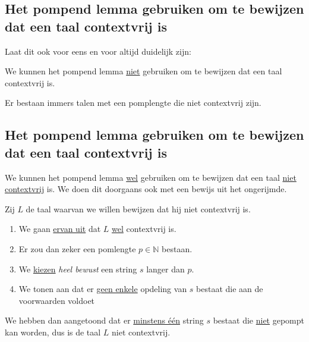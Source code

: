\documentclass[main.tex]{subfiles}
\begin{document}
\subsection{Het pompend lemma gebruiken om te bewijzen dat een taal contextvrij is}
Laat dit ook voor eens en voor altijd duidelijk zijn:
\begin{center}
  We kunnen het pompend lemma \underline{niet} gebruiken om te bewijzen dat een taal contextvrij is.
\end{center}
Er bestaan immers talen met een pomplengte die niet contextvrij zijn.

\subsection{Het pompend lemma gebruiken om te bewijzen dat een taal contextvrij is}
We kunnen het pompend lemma \underline{wel} gebruiken om te bewijzen dat een taal \underline{niet contextvrij} is.
We doen dit doorgaans ook met een bewijs uit het ongerijmde.

Zij $L$ de taal waarvan we willen bewijzen dat hij niet contextvrij is.
\begin{enumerate}
\item We gaan \underline{ervan uit} dat $L$ \underline{wel} contextvrij is.
\item Er zou dan zeker een pomlengte $p\in \mathbb{N}$ bestaan.
\item We \underline{kiezen} \emph{heel bewust} een string $s$ langer dan $p$.
\item We tonen aan dat er \underline{geen enkele} opdeling van $s$ bestaat die aan de voorwaarden voldoet
\end{enumerate}
We hebben dan aangetoond dat er \underline{minstens \'e\'en} string $s$ bestaat die \underline{niet} gepompt kan worden, dus is de taal $L$ niet contextvrij.
\end{document}
